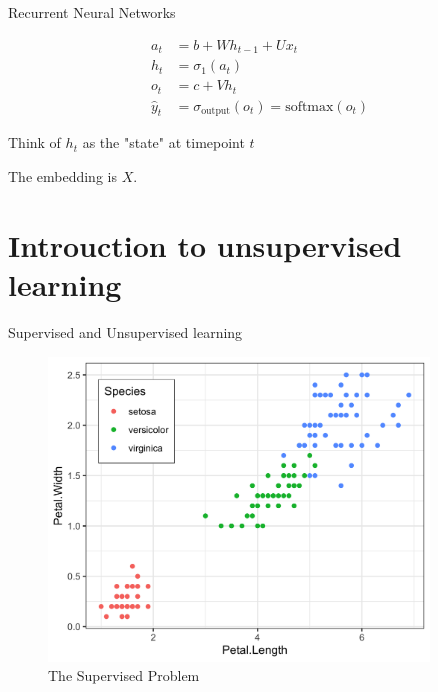\documentclass[10pt]{beamer}
\begin{document}
\begin{frame}{Recurrent Neural Networks}

\begin{align*}
a_t &= b + W h_{t-1} + U x_t \\
h_t &= \sigma_1(a_t) \\
o_t &= c + V h_{t} \\
\hat{y}_t & = \sigma_{\text{output}}(o_t) = \text{softmax}(o_t)
\end{align*}

Think of $h_t$ as the "state" at timepoint $t$

The embedding is $X$.

\end{frame}


\section{Introuction to unsupervised learning}

\begin{frame}{Supervised and Unsupervised learning}

\begin{figure}[h]
\centering
\includegraphics[width=0.9\textwidth]{fig/iris_supervised.png}
\caption{The Supervised Problem}
\end{figure}

\end{frame}
\end{document}
